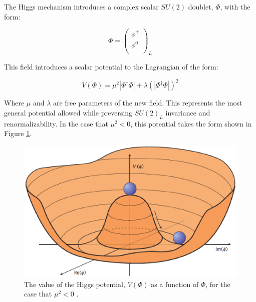 The Higgs mechanism introduces a complex scalar $SU(2)$ doublet, $\Phi$, with the form:

\begin{equation}
  \label{eq:phiDoublet}
  \Phi = 
  \begin{pmatrix}                                                                                                           
    \phi^+ \\                                                                                                               
    \phi^0 \\                                                                                                                            
  \end{pmatrix}_L                                                                                                                    
\end{equation}

This field introduces a scalar potential to the Lagrangian of the form:

\begin{equation}
  \label{eq:higgsV}
  V(\Phi) = \mu^2|\Phi^\dagger\Phi| + \lambda (|\Phi^\dagger \Phi|)^2
\end{equation}

Where $\mu$ and $\lambda$ are free parameters of the new field. This represents the most general potential allowed while preversing $SU(2)_L$ invariance and renormalizability. In the case that $\mu^2 < 0$, this potential takes the form shown in Figure \ref{fig:higgspotential}.

\begin{figure}[H]
\centering
   \includegraphics[width=0.75\linewidth]{figures/theory/higgspotential.eps}
\caption{The value of the Higgs potential, $V(\Phi)$ as a function of $\Phi$, for the case that $\mu^2 < 0$ \cite{Ellis:1638469}.}
\label{fig:higgspotential}
\end{figure}

